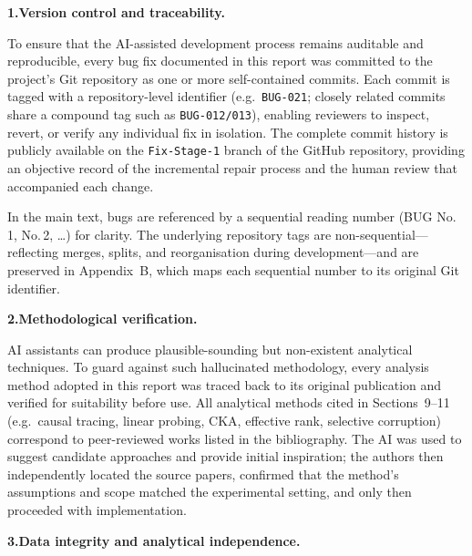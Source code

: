 \documentclass[10pt]{article}
\begin{document}
\vspace{1em}

\textbf{1.\quad Version control and traceability.}

\vspace{0.4em}

To ensure that the AI-assisted development process remains auditable and reproducible, every bug fix documented in this report was committed to the project's Git repository as one or more self-contained commits. Each commit is tagged with a repository-level identifier (e.g.\ \texttt{BUG-021}; closely related commits share a compound tag such as \texttt{BUG-012/013}), enabling reviewers to inspect, revert, or verify any individual fix in isolation. The complete commit history is publicly available on the \texttt{Fix-Stage-1} branch of the GitHub repository, providing an objective record of the incremental repair process and the human review that accompanied each change.

In the main text, bugs are referenced by a sequential reading number (BUG No.\,1, No.\,2, \ldots) for clarity. The underlying repository tags are non-sequential---reflecting merges, splits, and reorganisation during development---and are preserved in Appendix~B, which maps each sequential number to its original Git identifier.

\vspace{0.8em}

\textbf{2.\quad Methodological verification.}

\vspace{0.4em}

AI assistants can produce plausible-sounding but non-existent analytical techniques. To guard against such hallucinated methodology, every analysis method adopted in this report was traced back to its original publication and verified for suitability before use. All analytical methods cited in Sections~9--11 (e.g.\ causal tracing, linear probing, CKA, effective rank, selective corruption) correspond to peer-reviewed works listed in the bibliography. The AI was used to suggest candidate approaches and provide initial inspiration; the authors then independently located the source papers, confirmed that the method's assumptions and scope matched the experimental setting, and only then proceeded with implementation.

\vspace{0.8em}

\textbf{3.\quad Data integrity and analytical independence.}
\end{document}
